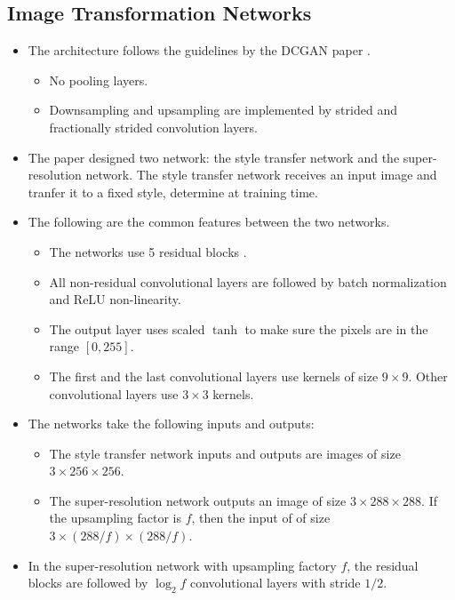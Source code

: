 \documentclass[10pt]{article}
\begin{document}
  \subsection{Image Transformation Networks}

  \begin{itemize}
  	\item The architecture follows the guidelines by the DCGAN paper \cite{Radford:2016}.
  	\begin{itemize}
  		\item No pooling layers.
  		\item Downsampling and upsampling are implemented by strided and fractionally strided convolution layers.      
  	\end{itemize}

    \item The paper designed two network: the style transfer network and the super-resolution network. The style transfer network receives an input image and tranfer it to a fixed style, determine at training time.

    \item The following are the common features between the two networks.
    \begin{itemize}
      \item The networks use 5 residual blocks \cite{He:2015}.
      \item All non-residual convolutional layers are followed by batch normalization and ReLU non-linearity. 
      \item The output layer uses scaled $\tanh$ to make sure the pixels are in the range $[0,255]$.
      \item The first and the last convolutional layers use kernels of size $9 \times 9$. Other convolutional layers use $3 \times 3$ kernels.
    \end{itemize}    

    \item The networks take the following inputs and outputs:
    \begin{itemize}
      \item The style transfer network inputs and outputs are images of size $3 \times 256 \times 256$.
      \item The super-resolution network outputs an image of size $3 \times 288 \times 288$. If the upsampling factor is $f$, then the input of of size $3 \times (288/f) \times (288/f)$.
    \end{itemize}

    \item In the super-resolution network with upsampling factory $f$, the residual blocks are followed by $\log_2 f$ convolutional layers with stride $1/2$.


\end{itemize}
\end{document}
